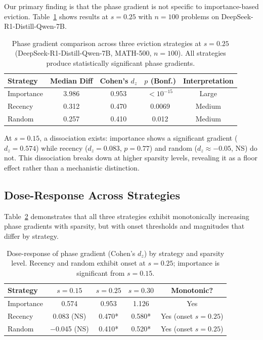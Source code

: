 \documentclass[11pt]{article}
\begin{document}
Our primary finding is that the phase gradient is not specific to importance-based eviction. Table~\ref{tab:strategy_comparison} shows results at $s=0.25$ with $n=100$ problems on DeepSeek-R1-Distill-Qwen-7B.

\begin{table}[h]
\centering
\caption{Phase gradient comparison across three eviction strategies at $s=0.25$ (DeepSeek-R1-Distill-Qwen-7B, MATH-500, $n=100$). All strategies produce statistically significant phase gradients.}
\label{tab:strategy_comparison}
\begin{tabular}{lcccc}
\toprule
Strategy & Median Diff & Cohen's $d_z$ & $p$ (Bonf.) & Interpretation \\
\midrule
Importance & 3.986 & 0.953 & $<10^{-15}$ & Large \\
Recency & 0.312 & 0.470 & 0.0069 & Medium \\
Random & 0.257 & 0.410 & 0.012 & Medium \\
\bottomrule
\end{tabular}
\end{table}

At $s=0.15$, a dissociation exists: importance shows a significant gradient ($d_z = 0.574$) while recency ($d_z = 0.083$, $p = 0.77$) and random ($d_z \approx -0.05$, NS) do not. This dissociation breaks down at higher sparsity levels, revealing it as a floor effect rather than a mechanistic distinction.

\subsection{Dose-Response Across Strategies}

Table~\ref{tab:dose_response} demonstrates that all three strategies exhibit monotonically increasing phase gradients with sparsity, but with onset thresholds and magnitudes that differ by strategy.

\begin{table}[h]
\centering
\caption{Dose-response of phase gradient (Cohen's $d_z$) by strategy and sparsity level. Recency and random exhibit onset at $s=0.25$; importance is significant from $s=0.15$.}
\label{tab:dose_response}
\begin{tabular}{lcccc}
\toprule
Strategy & $s=0.15$ & $s=0.25$ & $s=0.30$ & Monotonic? \\
\midrule
Importance & 0.574 & 0.953 & 1.126 & Yes \\
Recency & 0.083 (NS) & 0.470* & 0.580* & Yes (onset $s=0.25$) \\
Random & $-$0.045 (NS) & 0.410* & 0.520* & Yes (onset $s=0.25$) \\
\bottomrule
\end{tabular}
\end{table}
\end{document}
